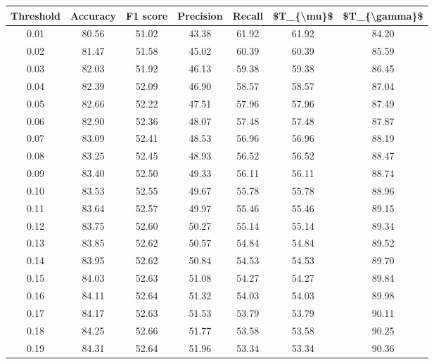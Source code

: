 \begin{tabular}{|c|c|c|c|c|c|c|}
\hline
 Threshold &  Accuracy &  F1 score &  Precision &  Recall &  \$T\_\{\textbackslash mu\}\$ &  \$T\_\{\textbackslash gamma\}\$ \\
\hline
      0.01 &     80.56 &     51.02 &      43.38 &   61.92 &      61.92 &         84.20 \\
      0.02 &     81.47 &     51.58 &      45.02 &   60.39 &      60.39 &         85.59 \\
      0.03 &     82.03 &     51.92 &      46.13 &   59.38 &      59.38 &         86.45 \\
      0.04 &     82.39 &     52.09 &      46.90 &   58.57 &      58.57 &         87.04 \\
      0.05 &     82.66 &     52.22 &      47.51 &   57.96 &      57.96 &         87.49 \\
      0.06 &     82.90 &     52.36 &      48.07 &   57.48 &      57.48 &         87.87 \\
      0.07 &     83.09 &     52.41 &      48.53 &   56.96 &      56.96 &         88.19 \\
      0.08 &     83.25 &     52.45 &      48.93 &   56.52 &      56.52 &         88.47 \\
      0.09 &     83.40 &     52.50 &      49.33 &   56.11 &      56.11 &         88.74 \\
      0.10 &     83.53 &     52.55 &      49.67 &   55.78 &      55.78 &         88.96 \\
      0.11 &     83.64 &     52.57 &      49.97 &   55.46 &      55.46 &         89.15 \\
      0.12 &     83.75 &     52.60 &      50.27 &   55.14 &      55.14 &         89.34 \\
      0.13 &     83.85 &     52.62 &      50.57 &   54.84 &      54.84 &         89.52 \\
      0.14 &     83.95 &     52.62 &      50.84 &   54.53 &      54.53 &         89.70 \\
      0.15 &     84.03 &     52.63 &      51.08 &   54.27 &      54.27 &         89.84 \\
      0.16 &     84.11 &     52.64 &      51.32 &   54.03 &      54.03 &         89.98 \\
      0.17 &     84.17 &     52.63 &      51.53 &   53.79 &      53.79 &         90.11 \\
      0.18 &     84.25 &     52.66 &      51.77 &   53.58 &      53.58 &         90.25 \\
      0.19 &     84.31 &     52.64 &      51.96 &   53.34 &      53.34 &         90.36 \\

\end{tabular}
